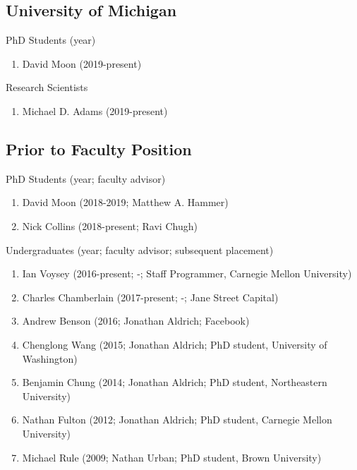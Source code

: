 \documentclass[10pt,letterpaper]{article}
\renewenvironment{itemize}{
  \begin{list}{}{
    \setlength{\leftmargin}{1.25em}
    \setlength{\itemsep}{0.25em}
    \setlength{\parskip}{0pt}
    \setlength{\parsep}{0.2em}
  }
}{
  \end{list}
}
\begin{document}
\subsection*{University of Michigan}
\begin{itemize}
\item PhD Students (year)
  \begin{enumerate}
    \item David Moon (2019-present)
  \end{enumerate}
\item Research Scientists
  \begin{enumerate}
    \item Michael D. Adams (2019-present)
  \end{enumerate}
\end{itemize}

\subsection*{Prior to Faculty Position}

\begin{itemize}
\item PhD Students (year; faculty advisor)
  \begin{enumerate}
    \item David Moon (2018-2019; Matthew A. Hammer)
    \item Nick Collins (2018-present; Ravi Chugh)
  \end{enumerate}
\item Undergraduates (year; faculty advisor; subsequent placement)
  \begin{enumerate}
  \item Ian Voysey (2016-present; -; Staff Programmer, Carnegie Mellon University)
  \item Charles Chamberlain (2017-present; -; Jane Street Capital)
  \item Andrew Benson (2016; Jonathan Aldrich; Facebook)
  \item Chenglong Wang (2015; Jonathan Aldrich; PhD student, University of Washington)
  \item Benjamin Chung (2014; Jonathan Aldrich; PhD student, Northeastern University)
  \item Nathan Fulton (2012; Jonathan Aldrich; PhD student, Carnegie Mellon University)
  \item Michael Rule (2009; Nathan Urban; PhD student, Brown University)
  \end{enumerate}
\end{itemize}
\end{document}
